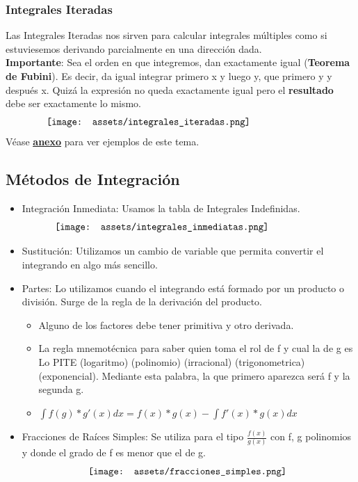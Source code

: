 \documentclass[10pt,a4paper]{article}
\begin{document}
\subsubsection*{Integrales Iteradas}
Las Integrales Iteradas nos sirven para calcular integrales múltiples como si estuviesemos derivando parcialmente en una dirección dada. \\
\textbf{Importante}: Sea el orden en que integremos, dan exactamente igual (\textbf{Teorema de Fubini}). Es decir, da igual integrar primero x y luego y, que primero y y después x. Quizá la expresión no queda exactamente igual pero el \textbf{resultado} debe ser exactamente lo mismo.
\[\begin{minipage}[b]{0.8\textwidth}
    \texttt{[image: assets/integrales\_iteradas.png]}
\end{minipage}\]
Véase \hyperref[subsec:integrales_iteradas]{\textbf{\underline{anexo}}} para ver ejemplos de este tema.
\subsection*{Métodos de Integración}
\begin{itemize}
    \item Integración Inmediata: Usamos la tabla de Integrales Indefinidas.
    \[\begin{minipage}[b]{0.8\textwidth}
    \texttt{[image: assets/integrales\_inmediatas.png]}
\end{minipage}\]
    \item Sustitución: Utilizamos un cambio de variable que permita convertir el integrando en algo más sencillo.
    \item Partes: Lo utilizamos cuando el integrando está formado por un producto o división. Surge de la regla de la derivación del producto. 
    \begin{itemize}
        \item Alguno de los factores debe tener primitiva y otro derivada.
        \item La regla mnemotécnica para saber quien toma el rol de f y cual la de g es Lo PITE (logaritmo) (polinomio) (irracional) (trigonometrica) (exponencial). Mediante esta palabra, la que primero aparezca será f y la segunda g.
        \item $\int f(g) * g'(x) dx = f(x) * g(x) - \int f'(x) * g(x) dx$
    \end{itemize}
    \item Fracciones de Raíces Simples: Se utiliza para el tipo $\frac{f(x)}{g(x)}$ con f, g polinomios y donde el grado de f es menor que el de g. 
    \[\begin{minipage}[b]{0.6\textwidth}
    \texttt{[image: assets/fracciones\_simples.png]}
\end{minipage}\]
\end{itemize}
\end{document}
